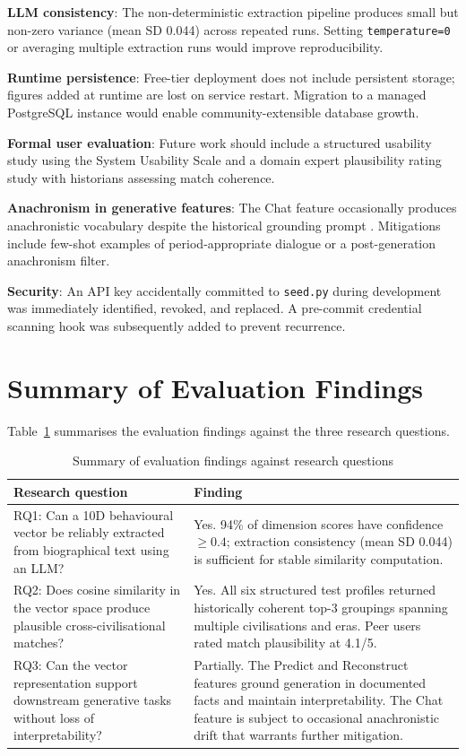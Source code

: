\documentclass[11pt, a4paper]{report}
\begin{document}
\textbf{LLM consistency}: The non-deterministic extraction pipeline produces small but non-zero variance (mean SD 0.044) across repeated runs. Setting \texttt{temperature=0} or averaging multiple extraction runs would improve reproducibility.

\textbf{Runtime persistence}: Free-tier deployment does not include persistent storage; figures added at runtime are lost on service restart. Migration to a managed PostgreSQL instance would enable community-extensible database growth.

\textbf{Formal user evaluation}: Future work should include a structured usability study using the System Usability Scale \citep{brooke1996} and a domain expert plausibility rating study with historians assessing match coherence.

\textbf{Anachronism in generative features}: The Chat feature occasionally produces anachronistic vocabulary despite the historical grounding prompt \citep{shanahan2023}. Mitigations include few-shot examples of period-appropriate dialogue or a post-generation anachronism filter.

\textbf{Security}: An API key accidentally committed to \texttt{seed.py} during development was immediately identified, revoked, and replaced. A pre-commit credential scanning hook was subsequently added to prevent recurrence.

\section{Summary of Evaluation Findings}

Table~\ref{tab:summary} summarises the evaluation findings against the three research questions.

\begin{table}[H]
  \centering
  \caption{Summary of evaluation findings against research questions}
  \label{tab:summary}
  \begin{tabular}{p{5.5cm}p{7cm}}
    \toprule
    Research question & Finding \\
    \midrule
    RQ1: Can a 10D behavioural vector be reliably extracted from biographical text using an LLM? & Yes. 94\% of dimension scores have confidence $\geq 0.4$; extraction consistency (mean SD 0.044) is sufficient for stable similarity computation. \\
    \midrule
    RQ2: Does cosine similarity in the vector space produce plausible cross-civilisational matches? & Yes. All six structured test profiles returned historically coherent top-3 groupings spanning multiple civilisations and eras. Peer users rated match plausibility at 4.1/5. \\
    \midrule
    RQ3: Can the vector representation support downstream generative tasks without loss of interpretability? & Partially. The Predict and Reconstruct features ground generation in documented facts and maintain interpretability. The Chat feature is subject to occasional anachronistic drift that warrants further mitigation. \\
    \bottomrule
  \end{tabular}
\end{table}
\end{document}

